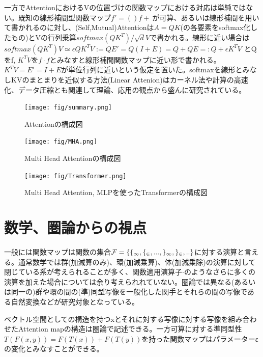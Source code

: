 \documentclass[a4paper,11pt]{article}
\begin{document}
一方でAttentionにおけるVの位置づけの関数マップにおける対応は単純ではない。既知の線形補間型関数マップ$f'=()f+~$が可算、あるいは線形補間を用いて書かれるのに対し、(Self,Mutual)Attentionは$A=QK$(の各要素をsoftmax化したもの)とVの行列乗算$softmax(QK^T)/\sqrt{d}V$で書かれる。線形に近い場合は$softmax(QK^T)V\simeq\epsilon QK^TV:=QE'=Q(I+E)=Q+QE=:Q+\epsilon K^TV$
とQをf, $K^TV$を$f\cdot f$とみなすと線形補間関数マップに近い形で書かれる。$K^TV=E'=I+E$が単位行列に近いという仮定を置いた。softmaxを線形とみなしKVのまとまりを近似する方法(Linear Attenion)はカーネル法や計算の高速化、データ圧縮とも関連して理論、応用の観点から盛んに研究されている\cite{katharopoulos2020transformersrnnsfastautoregressive}。

\begin{figure}[htbp]
\begin{center}
\texttt{[image: fig/summary.png]}
\caption{Attentionの構成図}
\end{center}
\end{figure}

\begin{figure}[htbp]
\begin{center}
\texttt{[image: fig/MHA.png]}
\caption{Multi Head Attentionの構成図}
\end{center}
\end{figure}
  
\begin{figure}[htbp]
\begin{center}
\texttt{[image: fig/Transformer.png]}
\caption{Multi Head Attention, MLPを使ったTransformerの構成図}
\end{center}
\end{figure}
  
\section{数学、圏論からの視点}
一般には関数マップは関数の集合$\cal{F}=\{f_1,f_2,...,g_1,g_2,..\}$に対する演算と言える。通常数学では群(加減算のみ)、環(加減乗算)、体(加減乗除)の演算に対して閉じている系が考えられることが多く、関数適用演算子$\cdot$のようなさらに多くの演算を加えた場合については余り考えられれていない。圏論では異なる(あるいは同一の)群や環の間の(準)同型写像を一般化した関手とそれらの間の写像である自然変換などが研究対象となっている。

ベクトル空間としての構造を持つxとそれに対する写像に対する写像を組み合わせたAttention mapの構造は圏論で記述できる。一方可算に対する準同型性$T(F(x,y))=F(T(x))+F(T(y))$を持った関数マップはパラメーターεの変化とみなすことができる。
\end{document}
